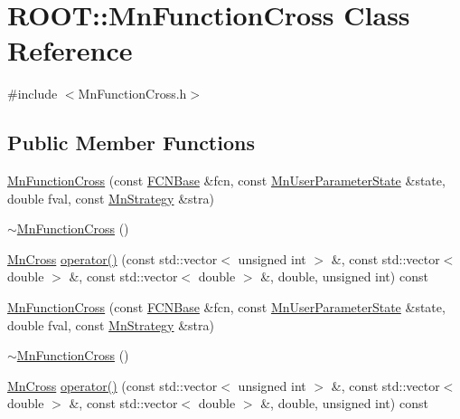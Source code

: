 \hypertarget{classROOT_1_1Minuit2_1_1MnFunctionCross}{}\section{R\+O\+OT\+:\+:Mn\+Function\+Cross Class Reference}
\label{classROOT_1_1Minuit2_1_1MnFunctionCross}


{\ttfamily \#include $<$Mn\+Function\+Cross.\+h$>$}

\subsection*{Public Member Functions}
\begin{DoxyCompactItemize}
\item 
\mbox{\hyperlink{classROOT_1_1Minuit2_1_1MnFunctionCross_a553cffc846a7ffc94ef777c660862f80}{Mn\+Function\+Cross}} (const \mbox{\hyperlink{classROOT_1_1Minuit2_1_1FCNBase}{F\+C\+N\+Base}} \&fcn, const \mbox{\hyperlink{classROOT_1_1Minuit2_1_1MnUserParameterState}{Mn\+User\+Parameter\+State}} \&state, double fval, const \mbox{\hyperlink{classROOT_1_1Minuit2_1_1MnStrategy}{Mn\+Strategy}} \&stra)
\item 
\mbox{\hyperlink{classROOT_1_1Minuit2_1_1MnFunctionCross_a6eddadf7793152d1c7a4604b2f374035}{$\sim$\+Mn\+Function\+Cross}} ()
\item 
\mbox{\hyperlink{classROOT_1_1Minuit2_1_1MnCross}{Mn\+Cross}} \mbox{\hyperlink{classROOT_1_1Minuit2_1_1MnFunctionCross_ace9b7e1472f82cb23525365e5f061477}{operator()}} (const std\+::vector$<$ unsigned int $>$ \&, const std\+::vector$<$ double $>$ \&, const std\+::vector$<$ double $>$ \&, double, unsigned int) const
\item 
\mbox{\hyperlink{classROOT_1_1Minuit2_1_1MnFunctionCross_a553cffc846a7ffc94ef777c660862f80}{Mn\+Function\+Cross}} (const \mbox{\hyperlink{classROOT_1_1Minuit2_1_1FCNBase}{F\+C\+N\+Base}} \&fcn, const \mbox{\hyperlink{classROOT_1_1Minuit2_1_1MnUserParameterState}{Mn\+User\+Parameter\+State}} \&state, double fval, const \mbox{\hyperlink{classROOT_1_1Minuit2_1_1MnStrategy}{Mn\+Strategy}} \&stra)
\item 
\mbox{\hyperlink{classROOT_1_1Minuit2_1_1MnFunctionCross_a6eddadf7793152d1c7a4604b2f374035}{$\sim$\+Mn\+Function\+Cross}} ()
\item 
\mbox{\hyperlink{classROOT_1_1Minuit2_1_1MnCross}{Mn\+Cross}} \mbox{\hyperlink{classROOT_1_1Minuit2_1_1MnFunctionCross_ace9b7e1472f82cb23525365e5f061477}{operator()}} (const std\+::vector$<$ unsigned int $>$ \&, const std\+::vector$<$ double $>$ \&, const std\+::vector$<$ double $>$ \&, double, unsigned int) const

\end{DoxyCompactItemize}
